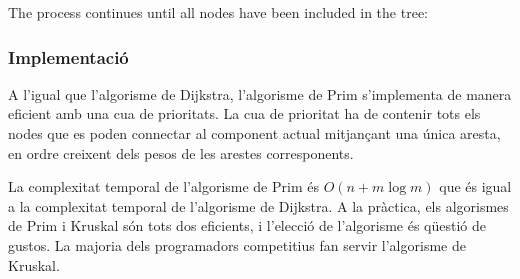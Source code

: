 \begin{samepage}
The process continues until all nodes have been included in the tree:
\begin{center}
\end{center}
\end{samepage}


\subsubsection{Implementació}

A l'igual que l'algorisme de Dijkstra, l'algorisme de Prim
s'implementa de manera eficient amb una cua de prioritats. La cua de
prioritat ha de contenir tots els nodes que es poden connectar al
component actual mitjançant una única aresta, en ordre creixent dels
pesos de les arestes corresponents.

La complexitat temporal de l'algorisme de Prim és $O(n + m \log m)$
que és igual a la complexitat temporal de l'algorisme de Dijkstra. A
la pràctica, els algorismes de Prim i Kruskal són tots dos eficients,
i l'elecció de l'algorisme és qüestió de gustos. La majoria dels
programadors competitius fan servir l'algorisme de Kruskal.
